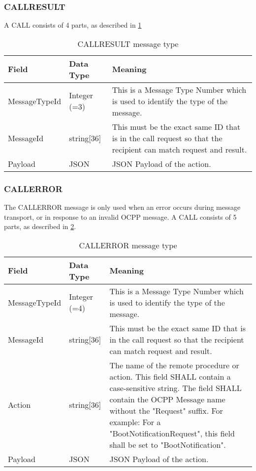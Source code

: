 \documentclass[12pt,openany,a4paper]{book}
\begin{document}
\subsubsection{CALLRESULT}
A CALL consists of 4 parts, as described in \ref{tab:CALLRESULT}

\begin{table}[H]
\begin{tabular}{ |p{3cm}|p{2.5cm}|p{9cm}| }
 \hline
\textbf{Field} & \textbf{Data Type} & \textbf{Meaning}
\\
 \hline MessageTypeId & Integer (=3) & This is a Message Type Number which is used to identify the type of the message.\\
 \hline MessageId & string[36] & This must be the exact same ID that is in the call request so that the recipient can match request and result.\\
 \hline Payload & JSON & JSON Payload of the action.\\
 \hline
\end{tabular}
\caption{CALLRESULT message type \cite{ocpp4}}
\label{tab:CALLRESULT}
\end{table}


\subsubsection{CALLERROR}
The CALLERROR message is only used when an error occurs during message transport, or in response to an invalid OCPP message. A CALL consists of 5 parts, as described in \ref{tab:CALLERROR}. 
\begin{table}[htp]
\begin{tabular}{ |p{3cm}|p{2.5cm}|p{9cm}| }
 \hline
\textbf{Field} & \textbf{Data Type} & \textbf{Meaning}
\\
 \hline MessageTypeId & Integer (=4)& This is a Message Type Number which is used to identify the type of the message.\\
 \hline MessageId & string[36] & This must be the exact same ID that is in the call request so that the recipient can match request and result.\\
 \hline Action & string[36] & The name of the remote procedure or action. This field SHALL contain a case-sensitive string.
The field SHALL contain the OCPP Message name without the "Request" suffix. For example: For
a "BootNotificationRequest", this field shall be set to "BootNotification".\\
 \hline Payload & JSON & JSON Payload of the action.\\
 \hline
\end{tabular}
\caption{CALLERROR message type \cite{ocpp4}}
\label{tab:CALLERROR}
\end{table}
\end{document}
